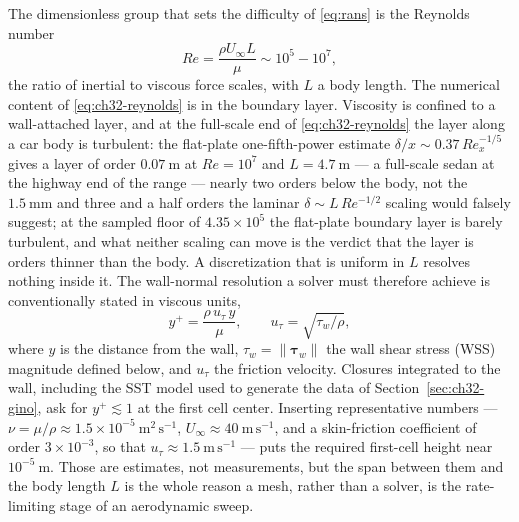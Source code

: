 The dimensionless group that sets the difficulty of \eqref{eq:rans} is the Reynolds number
\begin{equation}
  \label{eq:ch32-reynolds}
  Re = \frac{\rho U_\infty L}{\mu} \sim 10^5 - 10^7,
\end{equation}
the ratio of inertial to viscous force scales, with $L$ a body length.
The numerical content of \eqref{eq:ch32-reynolds} is
in the boundary layer. Viscosity is confined to a wall-attached layer, and at the
full-scale end of \eqref{eq:ch32-reynolds} the layer along a car body is turbulent: the flat-plate
one-fifth-power estimate $\delta/x \sim 0.37\,Re_x^{-1/5}$
\cite{schlichting2017boundary} gives a layer of order $0.07\ \mathrm{m}$ at $Re = 10^7$ and
$L = 4.7\ \mathrm{m}$ --- a full-scale sedan at the highway end of the range --- nearly
two orders below the body, not the $1.5\ \mathrm{mm}$ and three and a half orders the laminar
$\delta \sim L\,Re^{-1/2}$ scaling would falsely suggest; at the sampled floor of
$4.35\times10^{5}$ the flat-plate boundary layer is barely turbulent, and what
neither scaling can move is the verdict that the layer is orders thinner than the body. A discretization that
is uniform in $L$ resolves nothing inside it. The wall-normal resolution a solver must therefore
achieve is conventionally stated in viscous units,
\begin{equation}
  \label{eq:ch32-yplus}
  y^{+} = \frac{\rho\, u_\tau\, y}{\mu},
  \qquad u_\tau = \sqrt{\tau_w / \rho},
\end{equation}
where $y$ is the distance from the wall, $\tau_w = \|\boldsymbol{\tau}_w\|$ the wall shear
stress (WSS) magnitude defined below, and $u_\tau$ the friction velocity. Closures integrated to the
wall, including the SST model used to generate the data of Section~\ref{sec:ch32-gino}, ask for
$y^{+} \lesssim 1$ at the first cell center. Inserting representative numbers ---
$\nu = \mu/\rho \approx 1.5\times 10^{-5}\ \mathrm{m^2\,s^{-1}}$,
$U_\infty \approx 40\ \mathrm{m\,s^{-1}}$, and a skin-friction coefficient of order
$3\times 10^{-3}$, so that
$u_\tau \approx 1.5\ \mathrm{m\,s^{-1}}$ --- puts the required first-cell height near
$10^{-5}\ \mathrm{m}$. Those are estimates, not measurements, but the span between them and the
body length $L$ is the whole reason a mesh, rather than a solver, is the rate-limiting stage of
an aerodynamic sweep. 

